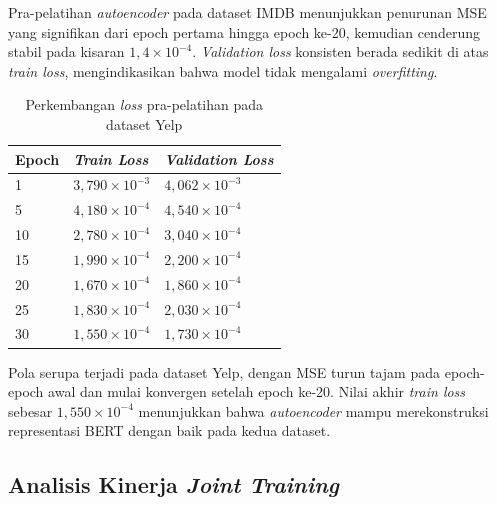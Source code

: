 Pra-pelatihan \textit{autoencoder} pada dataset IMDB menunjukkan penurunan
MSE yang signifikan dari epoch pertama hingga epoch ke-20, kemudian
cenderung stabil pada kisaran $1{,}4 \times 10^{-4}$. \textit{Validation
loss} konsisten berada sedikit di atas \textit{train loss}, mengindikasikan
bahwa model tidak mengalami \textit{overfitting}.

\begin{table}[H]
    \centering
    \caption{Perkembangan \textit{loss} pra-pelatihan pada dataset Yelp}
    \label{tab:pretrain_loss_yelp}
    \renewcommand{\arraystretch}{1.15}
    \begin{tabular}{C{2.0cm} C{3.5cm} C{3.5cm}}
        \toprule
        \textbf{Epoch}
        & \textbf{\textit{Train Loss}}
        & \textbf{\textit{Validation Loss}} \\
          & $3{,}790 \times 10^{-3}$ & $4{,}062 \times 10^{-3}$ \\
         5  & $4{,}180 \times 10^{-4}$ & $4{,}540 \times 10^{-4}$ \\
        10  & $2{,}780 \times 10^{-4}$ & $3{,}040 \times 10^{-4}$ \\
        15  & $1{,}990 \times 10^{-4}$ & $2{,}200 \times 10^{-4}$ \\
        20  & $1{,}670 \times 10^{-4}$ & $1{,}860 \times 10^{-4}$ \\
        25  & $1{,}830 \times 10^{-4}$ & $2{,}030 \times 10^{-4}$ \\
        30  & $1{,}550 \times 10^{-4}$ & $1{,}730 \times 10^{-4}$ \\
        \bottomrule
    \end{tabular}
\end{table}

Pola serupa terjadi pada dataset Yelp, dengan MSE turun tajam pada epoch-epoch
awal dan mulai konvergen setelah epoch ke-20. Nilai akhir \textit{train loss}
sebesar $1{,}550 \times 10^{-4}$ menunjukkan bahwa \textit{autoencoder} mampu
merekonstruksi representasi BERT dengan baik pada kedua dataset.

\setlength{\headheight}{14.5pt}
\addtolength{\topmargin}{-14.5pt}

\subsection{Analisis Kinerja \textit{Joint Training}}

